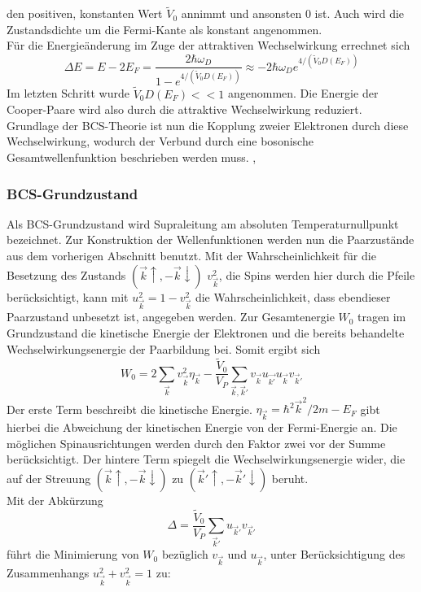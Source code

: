 den positiven, konstanten Wert $\tilde{V}_0$ annimmt und ansonsten 0 ist. 
Auch wird die Zustandsdichte um die Fermi-Kante als konstant angenommen.\\
Für die Energieänderung im Zuge der attraktiven Wechselwirkung errechnet sich 
\[
	\Delta E = E - 2 E_F = \frac{2\hbar \omega_D}{1- e^{4/(\tilde{V}_0 D(E_F))}}
			 \approx - 2 \hbar \omega_D e^{4/(\tilde{V}_0 D(E_F))}
\]
Im letzten Schritt wurde $\tilde{V}_0 D(E_F) << 1$ angenommen. Die Energie der
Cooper-Paare wird also durch die attraktive Wechselwirkung reduziert.
\\
Grundlage der BCS-Theorie ist nun die Kopplung zweier Elektronen durch diese 
Wechselwirkung, wodurch der Verbund durch eine bosonische Gesamtwellenfunktion
beschrieben werden muss. \cite{bcswiki}, \cite{hunklinger}

		\subsubsection{BCS-Grundzustand}
Als BCS-Grundzustand wird Supraleitung am absoluten Temperaturnullpunkt bezeichnet. 
Zur Konstruktion der Wellenfunktionen werden nun die Paarzustände aus dem 
vorherigen Abschnitt benutzt. Mit der Wahrscheinlichkeit für die Besetzung des
Zustands $(\vec{k} \uparrow, - \vec{k} \downarrow)$ $v_{\vec{k}}^2$, die Spins 
werden hier durch die Pfeile berücksichtigt, kann mit $u_{\vec{k}}^2 = 
1 - v_{\vec{k}}^2$ die Wahrscheinlichkeit, dass ebendieser Paarzustand unbesetzt 
ist, angegeben werden. Zur Gesamtenergie $W_0$ tragen im Grundzustand die kinetische
Energie der Elektronen und die bereits behandelte Wechselwirkungsenergie der 
Paarbildung bei. Somit ergibt sich
\[
	W_0 = 2 \sum_{\vec{k}} v_{\vec{k}}^2 \eta_{\vec{k}} - 
		  \frac{\tilde{V}_0}{V_P} \sum_{\vec{k}, \vec{k}'} v_{\vec{k}} u_{\vec{k'}}
		  						  u_{\vec{k}} v_{\vec{k}'}
\]
Der erste Term beschreibt die kinetische Energie. $\eta_{\vec{k}} = 
\hbar^2 \vec{k}^2/2m - E_F$ gibt hierbei die Abweichung der kinetischen Energie von
der Fermi-Energie an. Die möglichen Spinausrichtungen werden durch den Faktor zwei 
vor der Summe berücksichtigt. Der hintere Term spiegelt die Wechselwirkungsenergie 
wider, die auf der Streuung $( \vec{k} \uparrow, - \vec{k} \downarrow)$ zu 
$(\vec{k}' \uparrow, - \vec{k}' \downarrow)$ beruht.\\
Mit der Abkürzung
\[
	\Delta = \frac{\tilde{V}_0}{V_P} \sum_{\vec{k}'} u_{\vec{k}'} v_{\vec{k}'}
\]
führt die Minimierung von $W_0$ bezüglich $v_{\vec{k}}$ und $u_{\vec{k}}$, unter 
Berücksichtigung des Zusammenhangs $u_{\vec{k}}^2 + v_{\vec{k}}^2 = 1$ zu:
